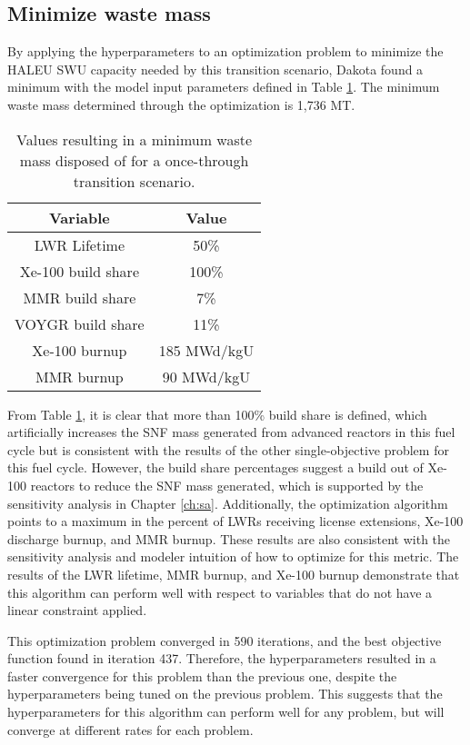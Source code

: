 \subsection{Minimize waste mass}
By applying the hyperparameters to an optimization problem to minimize the 
\gls{HALEU} \gls{SWU} capacity needed by this transition scenario, Dakota
found a minimum with the model input parameters defined in Table 
\ref{tab:soga_ot_waste}. The minimum waste mass determined through the 
optimization is 1,736 MT. 

\begin{table}
    \centering 
    \caption{Values resulting in a minimum waste mass disposed of for 
              a once-through transition scenario.}
    \label{tab:soga_ot_waste}
    \begin{tabular}{c c}
        \hline
        Variable & Value \\
        \hline
        LWR Lifetime & 50\%\\
        Xe-100 build share & 100\%\\
        MMR build share & 7\%\\
        VOYGR build share & 11\%\\
        Xe-100 burnup & 185 MWd/kgU\\
        MMR burnup & 90 MWd/kgU\\
        \hline
    \end{tabular}
\end{table}

From Table \ref{tab:soga_ot_waste}, it is clear that more than 100\% build share
is defined, which artificially increases the \gls{SNF} mass generated from 
advanced reactors in this fuel cycle but is consistent with the results of 
the other single-objective problem for this fuel cycle. However, the build share 
percentages suggest 
a build out of Xe-100 reactors to reduce the \gls{SNF} mass generated, which 
is supported by the sensitivity analysis in Chapter \ref{ch:sa}. Additionally, 
the optimization algorithm points to a maximum in the percent of \glspl{LWR} 
receiving license extensions, Xe-100 discharge burnup, and \gls{MMR} burnup. 
These results are also consistent with the sensitivity analysis and 
modeler intuition of how to optimize for this metric. The results of the 
\gls{LWR} lifetime, \gls{MMR} burnup, and Xe-100 burnup demonstrate that this 
algorithm can perform well with respect to variables that do not have a 
linear constraint applied. 

This optimization problem converged in 590 iterations, and the best objective 
function found in iteration 437. Therefore, the hyperparameters resulted 
in a faster convergence for this problem than the previous one, despite the 
hyperparameters being tuned on the previous problem. This suggests that 
the hyperparameters for this algorithm can perform well for any problem, 
but will converge at different rates for each problem. 

